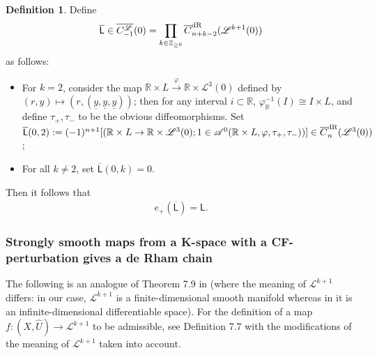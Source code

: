 \documentclass[10pt]{amsart}
\numberwithin{equation}{section}
\theoremstyle{plain}
\theoremstyle{definition}
\newtheorem{definition}[theorem]{Definition}
\theoremstyle{remark}
\numberwithin{equation}{section}
\newcommand{\R}{\mathbb{R}}
\newcommand{\Z}{\mathbb{Z}}
\newcommand{\wh}[1]{\widehat{#1}}
\newcommand{\ol}[1]{\overline{#1}}
\newcommand{\ms}[1]{\mathscr{#1}}
\newcommand{\dR}{\textup{dR}}
\newcommand{\Cfr}[1]{C_{#1}^\mathscr{L}}
\newcommand{\LL}{\textsf{L}}
\begin{document}
{\begin{definition}\label{Defn: IntervalE=0}
	Define \[\ol{\LL}\in \ol{\Cfr{-1}}(0) = \prod_{k\in \Z_{\geq 0}} \ol{C}^\dR_{n +k-2} (\ms{L}^{k+1}(0)) \]
	 as follows:
	\begin{itemize}
		\item For $k=2$, consider the map $\R\times L\xrightarrow{\varphi} \R\times \ms{L}^3(0)$ defined by $(r,y)\mapsto (r, (\underline{y},\underline{y},\underline{y}))$; then for any interval $i\subset \R$, $\varphi_\R^{-1}(I)\cong I\times L$, and define $\tau_+,\tau_-$ to be the obvious diffeomorphisms. Set $\ol{\LL}(0,2):= (-1)^{n+1}[(\R\times L\to \R\times \ms{L}^3(0);1\in \ms{A}^0(\R\times L, \varphi, \tau_+,\tau_-))] \in \ol{C}^\dR_{n}(\ms{L}^{3}(0))$;
		\item For all $k\neq 2$, set $\ol{\LL}(0,k)=0$.
	\end{itemize}
\end{definition}

Then it follows that
\begin{align}\label{Eq: [0,1]xL}
	e_+(\ol{\LL}) = \LL.	
\end{align}



\subsubsection{Strongly smooth maps from a K-space with a CF-perturbation gives a de Rham chain}


The following is an analogue of Theorem 7.9 in \cite{Irie2} (where the meaning of $\mathscr{L}^{k+1}$ differs: in our case, $\mathscr{L}^{k+1}$ is a finite-dimensional smooth manifold whereas in \cite{Irie2} it is an infinite-dimensional differentiable space).
For the definition of a map $f\colon (X,\wh{U})\to \ms{L}^{k+1}$ to be admissible, see \cite{Irie2} Definition 7.7 with the modifications of the meaning of $\ms{L}^{k+1}$ taken into account.


}
\end{document}
